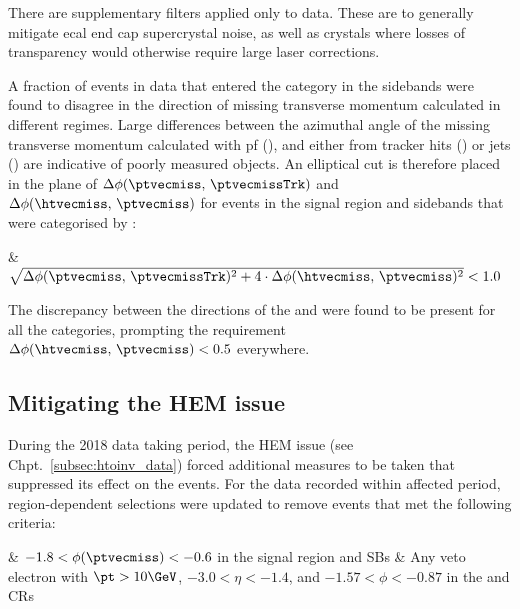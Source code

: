 \medskip

\noindent{}There are supplementary filters applied only to data. These are to generally mitigate \acrshort{ecal} end cap supercrystal noise, as well as crystals where losses of transparency would otherwise require large laser corrections.

A fraction of events in data that entered the \ttH category in the sidebands were found to disagree in the direction of missing transverse momentum calculated in different regimes. Large differences between the azimuthal angle of the missing transverse momentum calculated with \acrlong{pf} (\ptvecmiss), and either from tracker hits (\ptvecmissTrk) or \glspl{jet} (\htvecmiss) are indicative of poorly measured objects. An elliptical cut is therefore placed in the plane of $\Delta\phi(\ptvecmiss, \, \ptvecmissTrk)$ and $\Delta\phi(\htvecmiss, \, \ptvecmiss)$ for events in the signal region and sidebands that were categorised by \ttH:

\medskip

\begin{easylist}[itemize]
    \cutflowlistprops
    & $\sqrt{ \Delta\phi(\ptvecmiss, \, \ptvecmissTrk)^2 + \text{4} \cdot \Delta\phi(\htvecmiss, \, \ptvecmiss)^2 } < \text{1.0}$
\end{easylist}

The discrepancy between the directions of the \htvecmiss and \ptvecmiss were found to be present for all the categories, prompting the requirement $\Delta\phi(\htvecmiss, \, \ptvecmiss) < \text{0.5}$ everywhere.




\subsection{Mitigating the HEM issue}
\label{subsec:htoinv_hem_mitigation}

During the 2018 data taking period, the HEM issue (see Chpt.~\ref{subsec:htoinv_data}) forced additional measures to be taken that suppressed its effect on the events. For the data recorded within affected period, region-dependent selections were updated to remove events that met the following criteria:
\medskip
\begin{easylist}[itemize]
    \cutflowlistprops
    & $-\text{1.8} < \phi(\ptvecmiss) < -\text{0.6}$ in the signal region and \glspl{SB}
    & Any veto electron \vetoEle with $\pt > \text{10}\GeV$, $-\text{3.0} < \eta < -\text{1.4}$, and $-\text{1.57} < \phi < -\text{0.87}$ in the \singleEleCr and \doubleEleCr \glspl{CR}
\end{easylist}

